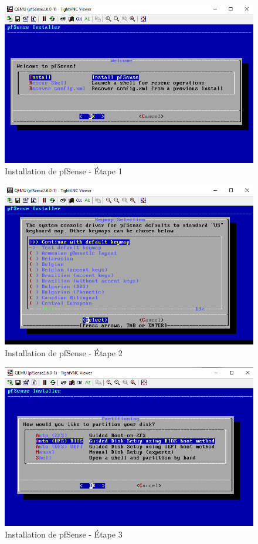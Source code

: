 \begin{figure}[H]
\centering
\includegraphics[width=15cm]{Images/BRadesMelian-Topologie3.png}
\caption{Installation de pfSense - Étape 1}
\label{Chap3.3.3}
\end{figure}

\begin{figure}[H]
\centering
\includegraphics[width=15cm]{Images/BRadesMelian-Topologie4.png}
\caption{Installation de pfSense - Étape 2}
\label{Chap3.3.4}
\end{figure}

\begin{figure}[H]
\centering
\includegraphics[width=15cm]{Images/BRadesMelian-Topologie5.png}
\caption{Installation de pfSense - Étape 3}
\label{Chap3.3.5}
\end{figure}

